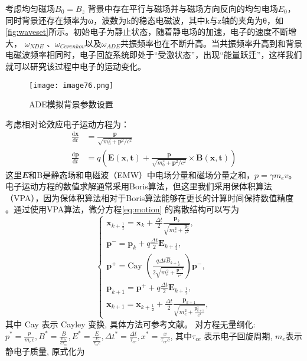 考虑均匀磁场$B_0=B_z$ 背景中存在平行与磁场并与磁场方向反向的均匀电场$E_0$，同时背景还存在频率为ω，波数为k的稳态电磁波，其中k与z轴的夹角为θ，如\autoref{fig:waveset}所示。初始电子为静止状态，随着静电场的加速，电子的速度不断增大， $ω_{NDE}$ 、$ω_{Cerenkov}$以及$ω_{ADE}$共振频率也在不断升高。当共振频率升高到和背景电磁波频率相同时，电子回旋系统即处于“受激状态”，出现“能量跃迁”，这样我们就可以研究该过程中电子的运动变化。

\begin{figure}
\centering
\texttt{[image: image76.png]}
\caption{\label{fig:waveset}ADE模拟背景参数设置}
\end{figure}
考虑相对论效应电子运动方程为：
\begin{equation}\label{eq:motion}
\begin{aligned}
\frac{\mathrm{d} \mathbf{x}}{\mathrm{d} t} & = \frac{\mathbf{p}}{\sqrt{m_{0}^{2}+\mathbf{p}^{2} / c^{2}}} \\\frac{\mathrm{d} \mathbf{p}}{\mathrm{d} t} & = q\left(\mathbf{E}(\boldsymbol{x}, \boldsymbol{t})+\frac{\mathbf{p}}{\sqrt{m_{0}^{2}+\mathbf{p}^{2} / c^{2}}} \times \mathbf{B}(\boldsymbol{x}, \boldsymbol{t})\right)
\end{aligned}
\end{equation}
这里$𝑬$和B是静态场和电磁波（EMW）中电场分量和磁场分量之和，$𝑝=𝛾𝑚_e𝑣$。
电子运动方程的数值求解通常采用Boris算法\cite{RN2016}，但这里我们采用保体积算法（VPA）\cite{RN1907}，因为保体积算法相对于Boris算法能够在更长的计算时间保持数值精度 。通过使用VPA算法，微分方程\eqref{eq:motion} 的离散结构可以写为
\begin{equation}
\left\{\begin{array}{l}\mathbf{x}_{k+\frac{1}{2}}=\mathbf{x}_{k}+\frac{\Delta t}{2} \frac{\mathbf{p}_{k}}{\sqrt{m_{e}^{2}+\frac{\mathbf{p}_{k}^{2}}{c^{2}}}}, \\\mathbf{p}^{-}=\mathbf{p}_{k}+q \frac{\Delta t}{2} \mathbf{E}_{k+\frac{1}{2}}, \\\mathbf{p}^{+}=\text {Cay }\left(\frac{q \Delta t \hat{B}_{k+\frac{1}{2}}}{2 \sqrt{m_{e}^{2}+\frac{\mathbf{p}^{-2}}{c^{2}}}}\right) \mathbf{p}^{-}, \\\mathbf{p}_{k+1}=\mathbf{p}^{+}+q \frac{\Delta t}{2} \mathbf{E}_{k+\frac{1}{2}}, \\\mathbf{x}_{k+1}=\mathbf{x}_{k+\frac{1}{2}}+\frac{\Delta t}{2} \frac{\mathbf{p}_{k+1}}{\sqrt{m_{e}^{2}+\frac{\mathbf{p}_{k+1}^{2}}{c^{2}}}},\end{array}\right.
\end{equation}
其中 Cay 表示 Cayley 变换, 具体方法可参考文献\cite{RN1907}。 对方程无量纲化:  $p^{*}=   \frac{p}{m_{e} c}, B^{*}=\frac{B}{\frac{m_{e}}{e \tau_{c e}}}, E^{*}=\frac{E}{\frac{E}{\tau_{e e} c}}, \Delta t^{*}=\frac{\Delta t}{\tau_{c e}}, x^{*}=\frac{x}{\tau_{c e} c} $, 其中$  \tau_{c e} $ 表示电子回旋周期, $ m_{e}  $表示静电子质量, 原式化为
